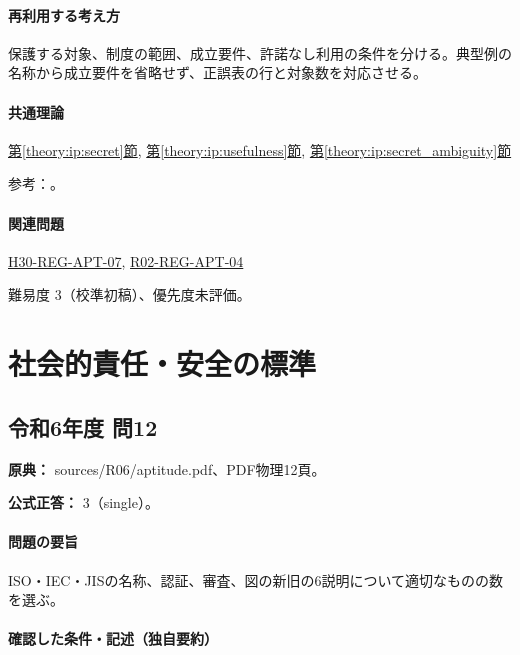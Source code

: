 \paragraph{再利用する考え方} 保護する対象、制度の範囲、成立要件、許諾なし利用の条件を分ける。典型例の名称から成立要件を省略せず、正誤表の行と対象数を対応させる。

\paragraph{共通理論} \hyperref[theory:ip:secret]{第\ref*{theory:ip:secret}節}, \hyperref[theory:ip:usefulness]{第\ref*{theory:ip:usefulness}節}, \hyperref[theory:ip:secret_ambiguity]{第\ref*{theory:ip:secret_ambiguity}節}

\par 参考：\cite{ip_unfair_statute,ip_secret_handbook2017}。

\paragraph{関連問題} \hyperref[q:h30-reg-apt-07]{H30-REG-APT-07}, \hyperref[q:r02-reg-apt-04]{R02-REG-APT-04}

\par 難易度 3（校準初稿）、優先度未評価。

\section{社会的責任・安全の標準}

\subsection{令和6年度 問12}
\label{q:r06-reg-apt-12}

\noindent\textbf{原典：} sources/R06/aptitude.pdf、PDF物理12頁。

\textbf{公式正答：} 3（single）。

\paragraph{問題の要旨} ISO・IEC・JISの名称、認証、審査、図の新旧の6説明について適切なものの数を選ぶ。

\paragraph{確認した条件・記述（独自要約）}\mbox{}\par

